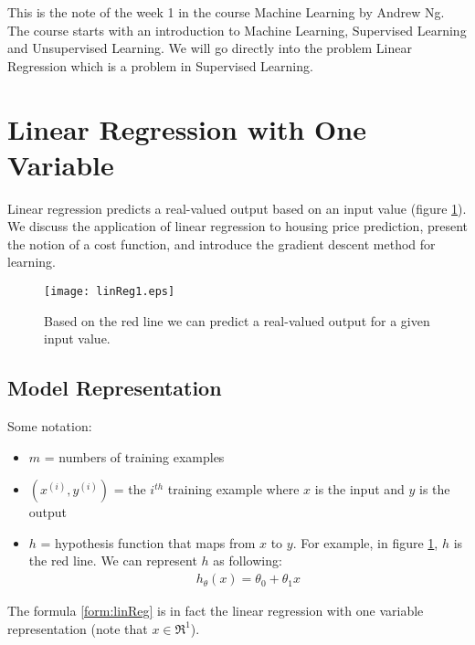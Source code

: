 This is the note of the week 1 in the course Machine Learning by Andrew Ng. The course starts with an introduction to Machine Learning, Supervised Learning and Unsupervised Learning. We will go directly into the problem Linear Regression which is a problem in Supervised Learning.
\section{Linear Regression with One Variable}
Linear regression predicts a real-valued output based on an input value (figure \ref{fig:linReg1}). We discuss the application of linear regression to housing price prediction, present the notion of a cost function, and introduce the gradient descent method for learning.
\begin{figure}[!ht]
\centering
\texttt{[image: linReg1.eps]}
\caption[Linear Regression]{Based on the red line we can predict a real-valued output for a given input value.}
\label{fig:linReg1}
\end{figure}

\subsection{Model Representation}
Some notation:
\begin{itemize}
	\item $m$ = numbers of training examples
	\item $(x^{(i)}, y^{(i)})$ = the $i^{th}$ training example where $x$ is the input and $y$ is the output 
	\item $h$ = hypothesis function that maps from $x$ to $y$. For example, in figure \ref{fig:linReg1}, $h$ is the red line. We can represent $h$ as following:
	\begin{align}
		h_{\theta}(x) = \theta_{0} + \theta_{1}x  
		\label{form:linReg}
	\end{align}
\end{itemize}
The formula \eqref{form:linReg} is in fact the linear regression with one variable representation (note that $x \in \Re^1$).

